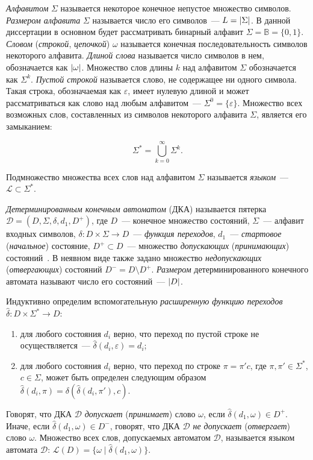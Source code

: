 \emph{Алфавитом} $\Sigma$ называется некоторое конечное непустое множество символов.
\emph{Размером алфавита} $\Sigma$ называется число его символов~{---} $L = \lvert\Sigma\rvert$.
В данной диссертации в основном будет рассматривать бинарный алфавит $\Sigma = \mathbb{B} = \{0, 1\}$.
\emph{Словом} (\emph{строкой}, \emph{цепочкой}) $\omega$ называется конечная последовательность символов некоторого алфавита. 
\emph{Длиной слова} называется число символов в нем, обозначается как $\lvert\omega\rvert$.
Множество слов длины $k$ над алфавитом $\Sigma$ обозначается как $\Sigma^{k}$.
\emph{Пустой строкой} называется слово, не содержащее ни одного символа.
Такая строка, обозначаемая как $\varepsilon$, имеет нулевую длиной и может рассматриваться как слово над любым алфавитом~{---} $\Sigma^{0}=\{\varepsilon\}$.
Множество всех возможных слов, составленных из символов некоторого алфавита $\Sigma$, является его замыканием:

\begin{equation*}
\Sigma^{*} = \bigcup_{k=0}^{\infty}\Sigma^{k}.
\end{equation*}

Подмножество множества всех слов над алфавитом $\Sigma$ называется \emph{языком}~--- $\mathcal{L} \subset \Sigma^{*}$.

\emph{Детерминированным конечным автоматом} (ДКА) называется пятерка $\mathcal{D} = \left(D,\Sigma,\delta,d_{1},D^{+}\right)$, где $D$~{---} конечное множество состояний, $\Sigma$~{---} алфавит входных символов, $\delta:D \times \Sigma \rightarrow D$~{---} \emph{функция переходов}, $d_{1}$~{---} \emph{стартовое} (\emph{начальное}) состояние, $D^{+} \subset D$~{---} множество \emph{допускающих} (\emph{принимающих}) состояний~\cite{automata-hopcroft-2001}. 
В неявном виде также задано множество \emph{недопускающих} (\emph{отвергающих}) состояний $D^{-} = D \setminus D^{+}$.
\emph{Размером} детерминированного конечного автомата называют число его состояний~--- $\lvert D\rvert$.

Индуктивно определим вспомогательную \emph{расширенную функцию переходов} $\hat{\delta}: D \times \Sigma^{*} \rightarrow D$:
\begin{enumerate}
  \item для любого состояния $d_{i}$ верно, что переход по пустой строке не осуществляется~{---} $\hat{\delta}\left(d_{i},\varepsilon\right) = d_{i}$;
  \item для любого состояния $d_{i}$ верно, что переход по строке $\pi = \pi'c$, где $\pi,\pi' \in \Sigma^{*}$, $c \in \Sigma$, может быть определен следующим образом $\hat{\delta}\left(d_{i}, \pi\right) = \delta\left(\hat{\delta}\left(d_{i}, \pi'\right), c\right)$.
\end{enumerate}
Говорят, что ДКА $\mathcal{D}$ \emph{допускает} (\emph{принимает}) слово $\omega$, если $\hat{\delta}\left(d_{1}, \omega\right) \in D^{+}$. 
Иначе, если $\hat{\delta}\left(d_{1}, \omega\right) \in D^{-}$, говорят, что ДКА $\mathcal{D}$ \emph{не допускает} (\emph{отвергает}) слово $\omega$. 
Множество всех слов, допускаемых автоматом $\mathcal{D}$, называется языком автомата $\mathcal{D}$: $\mathcal{L}\left(D\right) = \{\omega \mid \hat{\delta}\left(d_{1}, \omega \right)\}$.

